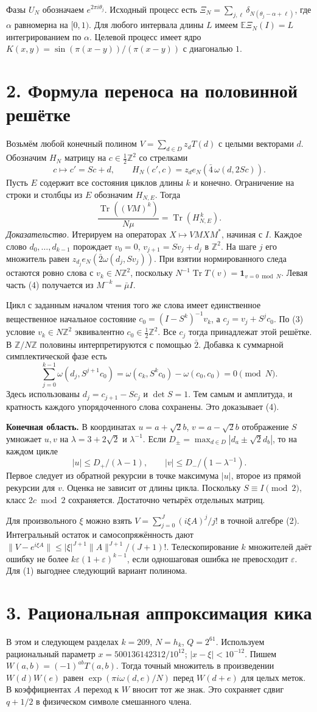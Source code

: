 \documentclass[11pt,a4paper]{article}
\newcommand{\Tr}{\operatorname{Tr}}
\newcommand{\EE}{\mathbb E}
\newcommand{\Z}{\mathbb Z}
\newcommand{\eps}{\varepsilon}
\newcommand{\sect}[1]{\section*{\sffamily\color{ink}#1}}
\newcommand{\subt}[1]{\par\medskip\noindent\textbf{#1.}\quad}
\begin{document}
Фазы $U_N$ обозначаем $e^{2\pi i\theta_j}$. Исходный процесс есть
$\Xi_N=\sum_{j,\ell}\delta_{N(\theta_j-\alpha+\ell)}$, где $\alpha$ равномерна на $[0,1)$. Для любого интервала длины $L$ имеем $\EE\Xi_N(I)=L$ интегрированием по $\alpha$. Целевой процесс имеет ядро $K(x,y)=\sin(\pi(x-y))/(\pi(x-y))$ с диагональю $1$.
\newpage
\sect{2. Формула переноса на половинной решётке}
Возьмём любой конечный полином $V=\sum_{d\in D}z_dT(d)$ с целыми векторами $d$. Обозначим $H_N$ матрицу на $c\in\frac12\Z^2$ со стрелками
\[
 c\longmapsto c'=Sc+d,\qquad
 H_N(c',c)=z_d e_N\!\left(\bar4\,\omega(d,2Sc)\right).
\]
Пусть $E$ содержит все состояния циклов длины $k$ и конечно. Ограничение на строки и столбцы из $E$ обозначим $H_{N,E}$. Тогда
\[
 \boxed{\frac{\Tr((VM)^k)}{N\mu}=\Tr(H_{N,E}^{\,k}) .}                 \tag{4}
\]
\textit{Доказательство.} Итерируем на операторах $X\mapsto VMXM^*$, начиная с $I$. Каждое слово $d_0,\ldots,d_{k-1}$ порождает $v_0=0$, $v_{j+1}=Sv_j+d_j$ в $\Z^2$. На шаге $j$ его множитель равен $z_{d_j}e_N(\bar2\omega(d_j,Sv_j))$. При взятии нормированного следа остаются ровно слова с $v_k\in N\Z^2$, поскольку $N^{-1}\Tr T(v)=\mathbf1_{v=0\bmod N}$. Левая часть (4) получается из $M^{-k}=\bar\mu I$.

Цикл с заданным началом чтения того же слова имеет единственное вещественное начальное состояние $c_0=(I-S^k)^{-1}v_k$, а $c_j=v_j+S^jc_0$. По (3) условие $v_k\in N\Z^2$ эквивалентно $c_0\in\tfrac12\Z^2$. Все $c_j$ тогда принадлежат этой решётке. В $\Z/N\Z$ половины интерпретируются с помощью $\bar2$. Добавка к суммарной симплектической фазе есть
\[
 \sum_{j=0}^{k-1}\omega(d_j,S^{j+1}c_0)
 =\omega(c_k,S^kc_0)-\omega(c_0,c_0)=0\pmod N .
\]
Здесь использованы $d_j=c_{j+1}-Sc_j$ и $\det S=1$. Тем самым и амплитуда, и кратность каждого упорядоченного слова сохранены. Это доказывает (4).

\subt{Конечная область} В координатах $u=a+\sqrt2 b$, $v=a-\sqrt2 b$ отображение $S$ умножает $u,v$ на $\lambda=3+2\sqrt2$ и $\lambda^{-1}$. Если $D_\pm=\max_{d\in D}|d_a\pm\sqrt2 d_b|$, то на каждом цикле
\[
 |u|\le D_+/(\lambda-1),\qquad |v|\le D_-/(1-\lambda^{-1}).              \tag{5}
\]
Первое следует из обратной рекурсии в точке максимума $|u|$, второе из прямой рекурсии для $v$. Оценка не зависит от длины цикла. Поскольку $S\equiv I\pmod2$, класс $2c\bmod2$ сохраняется. Достаточно четырёх отдельных матриц.

Для произвольного $\xi$ можно взять $V=\sum_{j=0}^J(i\xi A)^j/j!$ в точной алгебре (2). Интегральный остаток и самосопряжённость дают $\|V-e^{i\xi A}\|\le |\xi|^{J+1}\|A\|^{J+1}/(J+1)!$. Телескопирование $k$ множителей даёт ошибку не более $k\eps(1+\eps)^{k-1}$, если одношаговая ошибка не превосходит $\eps$. Для (1) выгоднее следующий вариант полинома.
\newpage
\sect{3. Рациональная аппроксимация кика}
В этом и следующем разделах $k=209$, $N=h_k$, $Q=2^{61}$. Используем рациональный параметр $x=500136142312/10^{12}$; $|x-\xi|<10^{-12}$. Пишем $W(a,b)=(-1)^{ab}T(a,b)$. Тогда точный множитель в произведении $W(d)W(e)$ равен $\exp(\pi i\omega(d,e)/N)$ перед $W(d+e)$ для целых меток. В коэффициентах $A$ переход к $W$ вносит тот же знак. Это сохраняет сдвиг $q+1/2$ в физическом символе смешанного члена.
\end{document}
